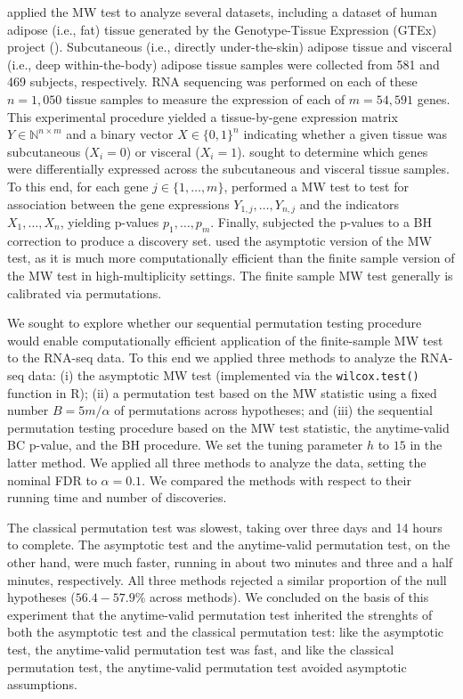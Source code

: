 \documentclass[12pt]{article}
\newcommand{\N}{\mathbb{N}}
\begin{document}
\cite{Li2022} applied the MW test to analyze several datasets, including a dataset of human adipose (i.e., fat) tissue generated by the Genotype-Tissue Expression (GTEx) project (\cite{Lonsdale2013}). Subcutaneous (i.e., directly under-the-skin) adipose tissue and visceral (i.e., deep within-the-body) adipose tissue samples were collected from 581 and 469 subjects, respectively. RNA sequencing was performed on each of these $n = 1,050$ tissue samples to measure the expression of each of $m = 54,591$ genes. This experimental procedure yielded a tissue-by-gene expression matrix $Y \in \N^{n \times m}$ and a binary vector $X \in \{0,1\}^{n}$ indicating whether a given tissue was subcutaneous ($X_i = 0$) or visceral ($X_i = 1$). \cite{Li2022} sought to determine which genes were differentially expressed across the subcutaneous and visceral tissue samples. To this end, for each gene $j \in \{1, \dots, m\}$, \cite{Li2022} performed a MW test to test for association between the gene expressions $Y_{1,j}, \dots, Y_{n,j}$ and the indicators $X_1, \dots, X_n$, yielding p-values $p_1, \dots, p_m$. Finally, \cite{Li2022} subjected the p-values to a BH correction to produce a discovery set. \cite{Li2022} used the asymptotic version of the MW test, as it is much more computationally efficient than the finite sample version of the MW test in high-multiplicity settings. The finite sample MW test generally is calibrated via permutations.

We sought to explore whether our sequential permutation testing procedure would enable computationally efficient application of the finite-sample MW test to the RNA-seq data. To this end we applied three methods to analyze the RNA-seq data: (i) the asymptotic MW test (implemented via the \texttt{wilcox.test()} function in R); (ii) a permutation test based on the MW statistic using a fixed number $B = 5m/\alpha$ of permutations across hypotheses; and (iii) the sequential permutation testing procedure based on the MW test statistic, the anytime-valid BC p-value, and the BH procedure. We set the tuning parameter $h$ to $15$ in the latter method. We applied all three methods to analyze the data, setting the nominal FDR to $\alpha = 0.1$. We compared the methods with respect to their running time and number of discoveries.
	
The classical permutation test was slowest, taking over three days and 14 hours to complete. The asymptotic test and the anytime-valid permutation test, on the other hand, were much faster, running in about two minutes and three and a half minutes, respectively. All three methods rejected a similar proportion of the null hypotheses ($56.4 - 57.9$\% across methods). We concluded on the basis of this experiment that the anytime-valid permutation test inherited the strenghts of both the asymptotic test and the classical permutation test: like the asymptotic test, the anytime-valid permutation test was fast, and like the classical permutation test, the anytime-valid permutation test avoided asymptotic assumptions.
		
\end{document}
